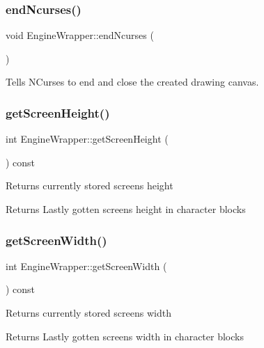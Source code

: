 \subsubsection{\texorpdfstring{end\+Ncurses()}{endNcurses()}}
{\footnotesize\ttfamily void Engine\+Wrapper\+::end\+Ncurses (\begin{DoxyParamCaption}{ }\end{DoxyParamCaption})}



Tells N\+Curses to end and close the created drawing canvas. 

\mbox{\label{classEngineWrapper_ad308af51b894a88370e5d29933d22e2e}} 
\subsubsection{\texorpdfstring{get\+Screen\+Height()}{getScreenHeight()}}
{\footnotesize\ttfamily int Engine\+Wrapper\+::get\+Screen\+Height (\begin{DoxyParamCaption}{ }\end{DoxyParamCaption}) const}

Returns currently stored screen\textquotesingle{}s height

\begin{DoxyReturn}{Returns}
Lastly gotten screen\textquotesingle{}s height in character blocks 
\end{DoxyReturn}
\mbox{\label{classEngineWrapper_a8f5165549dd3ab6a738d68828c18a3d7}} 
\subsubsection{\texorpdfstring{get\+Screen\+Width()}{getScreenWidth()}}
{\footnotesize\ttfamily int Engine\+Wrapper\+::get\+Screen\+Width (\begin{DoxyParamCaption}{ }\end{DoxyParamCaption}) const}

Returns currently stored screen\textquotesingle{}s width

\begin{DoxyReturn}{Returns}
Lastly gotten screen\textquotesingle{}s width in character blocks 
\end{DoxyReturn}
\mbox{\label{classEngineWrapper_a2831a7eb3e2743e72848014314fc7e0e}} 

